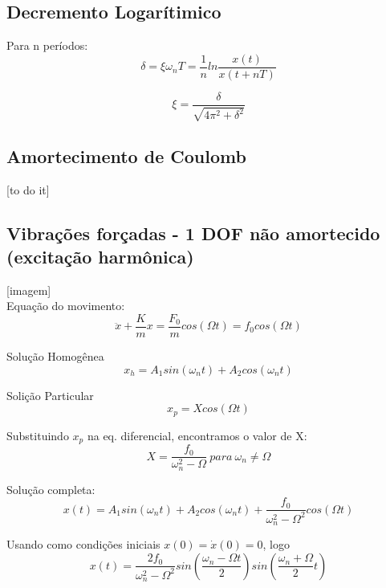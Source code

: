 \documentclass[a4paper, 12pt]{article}
\begin{document}
\subsection{Decremento Logarítimico}
	Para n períodos:
	\begin{equation}
	\boxed{\delta = \xi \omega_n T = \frac{1}{n} ln\frac{x(t)}{x(t + nT)}}
	\end{equation}
	
	\begin{equation}
	\boxed{\xi = \frac{\delta}{\sqrt{4 \pi^2 + \delta^2}}}
	\end{equation}
	
\subsection{Amortecimento de Coulomb}
	
	[to do it]
	
\subsection{Vibrações forçadas - 1 DOF não amortecido (excitação harmônica)}
	[imagem]\\
	
	Equação do movimento:
	\begin{equation}
	\ddot{x} + \frac{K}{m}x = \frac{F_0}{m}cos(\Omega t) = f_0 cos(\Omega t)
	\end{equation}

	Solução Homogênea
	\begin{equation}
	x_h = A_1 sin(\omega_n t) + A_2 cos(\omega_n t)
	\end{equation}
	
	Solição Particular
	\begin{equation}
	x_p = X cos(\Omega t)
	\end{equation}
	
	Substituindo $x_p$ na eq. diferencial, encontramos o valor de X:
	\begin{equation}
	X = \frac{f_0}{\omega_n^2 - \Omega} \ para \ \omega_n \neq \Omega
	\end{equation}
	
	Solução completa:
	\begin{equation}
	\boxed{x(t) = A_1 sin(\omega_n t) + A_2 cos(\omega_n t) + \frac{f_0}{\omega_n^2 - \Omega^2} cos(\Omega t)}
	\end{equation}
	
	Usando como condições iniciais $x(0) = \dot{x}(0) = 0$, logo
	\begin{equation}
	x(t) = \frac{2f_0}{\omega_n^2 - \Omega^2} sin(\frac{\omega_n - \Omega t}{2}) sin(\frac{\omega_n + \Omega}{2} t)
	\end{equation}
	
\end{document}
